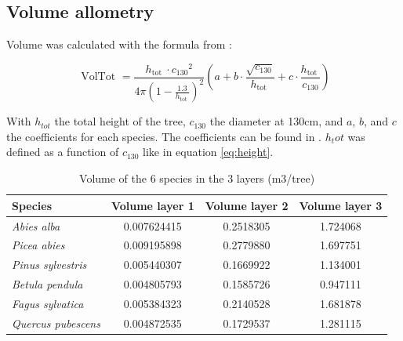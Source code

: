 \documentclass{article}
\begin{document}
\subsection{Volume allometry}

Volume was calculated with the formula from \autocite{deleuzeEstimerVolumeTotal2014} :

\begin{equation}
    \text { VolTot }=\frac{h_{\text {tot }} \cdot c_{130}{ }^2}{4 \pi\left(1-\frac{1.3}{h_{\text {tot }}}\right)^2}\left(a+b \cdot \frac{\sqrt{c_{130}}}{h_{\text {tot }}}+c \cdot \frac{h_{\text {tot }}}{c_{130}}\right)
\end{equation}

With $h_{tot}$ the total height of the tree, $c_{130}$ the diameter at 130cm, and $a$, $b$, and $c$ the coefficients for each species. The coefficients can be found in \autocite{deleuzeEstimerVolumeTotal2014}. $h_tot$ was defined as a function of $c_{130}$ like in equation \ref{eq:height}. 

\begin{table}[h]
    \centering
    \begin{tabular}{lccc}
    \hline
    \hline
    \textbf{Species} & \textbf{Volume layer 1} & \textbf{Volume layer 2} & \textbf{Volume layer 3} \\
    \hline
    \textit{Abies alba} & 0.007624415 & 0.2518305 & 1.724068 \\
    \textit{Picea abies} & 0.009195898 & 0.2779880 & 1.697751 \\
    \textit{Pinus sylvestris} & 0.005440307 & 0.1669922 & 1.134001 \\
    \textit{Betula pendula} & 0.004805793 & 0.1585726 & 0.947111 \\
    \textit{Fagus sylvatica} & 0.005384323 & 0.2140528 & 1.681878 \\
    \textit{Quercus pubescens} & 0.004872535 & 0.1729537 & 1.281115 \\
    \hline
    \hline
    \end{tabular}
    \caption{Volume of the 6 species in the 3 layers (m3/tree)}
    \label{tab:volume}
\end{table}
\end{document}
